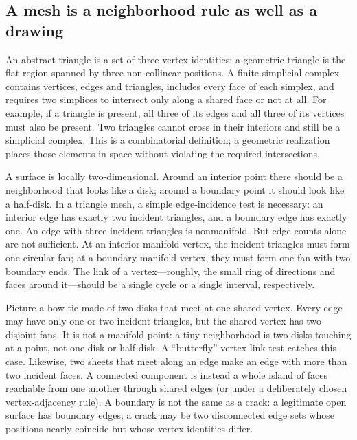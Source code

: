 
\subsection{A mesh is a neighborhood rule as well as a drawing}\label{03-visual-computing-i-ch002-a-mesh-is-a-neighborhood-rule-as-well-as-a-drawing}

\hypertarget{03-visual-computing-i-ch002-a-mesh-is-a-neighborhood-rule-as-well-as-a-drawing}{}

An abstract triangle is a set of three vertex identities; a geometric triangle is the flat region spanned by three non-collinear positions. A finite simplicial complex contains vertices, edges and triangles, includes every face of each simplex, and requires two simplices to intersect only along a shared face or not at all. For example, if a triangle is present, all three of its edges and all three of its vertices must also be present. Two triangles cannot cross in their interiors and still be a simplicial complex. This is a combinatorial definition; a geometric realization places those elements in space without violating the required intersections.

A surface is locally two-dimensional. Around an interior point there should be a neighborhood that looks like a disk; around a boundary point it should look like a half-disk. In a triangle mesh, a simple edge-incidence test is necessary: an interior edge has exactly two incident triangles, and a boundary edge has exactly one. An edge with three incident triangles is nonmanifold. But edge counts alone are not sufficient. At an interior manifold vertex, the incident triangles must form one circular fan; at a boundary manifold vertex, they must form one fan with two boundary ends. The link of a vertex---roughly, the small ring of directions and faces around it---should be a single cycle or a single interval, respectively.

Picture a bow-tie made of two disks that meet at one shared vertex. Every edge may have only one or two incident triangles, but the shared vertex has two disjoint fans. It is not a manifold point: a tiny neighborhood is two disks touching at a point, not one disk or half-disk. A ``butterfly'' vertex link test catches this case. Likewise, two sheets that meet along an edge make an edge with more than two incident faces. A connected component is instead a whole island of faces reachable from one another through shared edges (or under a deliberately chosen vertex-adjacency rule). A boundary is not the same as a crack: a legitimate open surface has boundary edges; a crack may be two disconnected edge sets whose positions nearly coincide but whose vertex identities differ.


